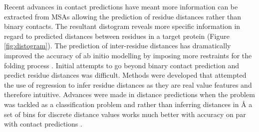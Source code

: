 Recent advances in contact predictions have meant more information can be extracted from MSAs allowing the prediction of residue distances rather than binary contacts.  The resultant distogram reveals more specific information in regard to predicted distances between residues in a target protein (Figure \ref{fig:distogram}). The prediction of inter-residue distances has dramatically improved the accuracy of ab initio modelling by imposing more restraints for the folding process \cite{du2021trrosetta}.  Initial attempts to go beyond binary contact prediction and predict residue distances was difficult. Methods were developed that attempted the use of regression to infer residue distances as they are real value features and therefore intuitive.  Advances were made in distance predictions when the problem was tackled as a classification problem and rather than inferring distances in {\AA} a set of bins for discrete distance values works much better with accuracy on par with contact predictions \cite{Greener2019}.

